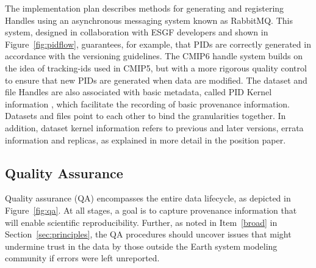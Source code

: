 \documentclass[gmd,manuscript]{copernicus}
\begin{document}
The implementation plan describes methods for generating and
registering Handles using an asynchronous messaging system known as
RabbitMQ. This system, designed in collaboration with ESGF developers
and shown in Figure~\ref{fig:pidflow}, guarantees, for example, that
PIDs are correctly generated in accordance with the versioning
guidelines. The CMIP6 handle system builds on the idea of tracking-ids
used in CMIP5, but with a more rigorous quality control to ensure that
new PIDs are generated when data are modified. The dataset and file
Handles are also associated with basic metadata, called PID Kernel
information \citep{ref:zhouetal2018}, which facilitate the recording
of basic provenance information. Datasets and files point to each
other to bind the granularities together. In addition, dataset kernel
information refers to previous and later versions, errata information
and replicas, as explained in more detail in the position paper.

\subsection{Quality Assurance}
\label{sec:qa}

Quality assurance (QA) encompasses the entire data lifecycle, as
depicted in Figure~\ref{fig:qa}. At all stages, a goal is to capture
provenance information that will enable scientific reproducibility.
Further, as noted in Item~\ref{broad} in Section~\ref{sec:principles},
the QA procedures should uncover issues that might undermine trust in
the data by those outside the Earth system modeling community if
errors were left unreported.

\begin{figure*}
  \begin{center}
  \end{center}
  \caption{Schematic of the phases of quality assurance, with earlier
    stages in the hands of modeling centers (left), and more formal
    long-term data curation stages at right. Quality assurance is
    applied both to the data (D, above) as well as the metadata (M)
    describing the data. Figure drawn from the WIP's Quality Assurance
    position paper.}
  \label{fig:qa}
\end{figure*}
\end{document}
